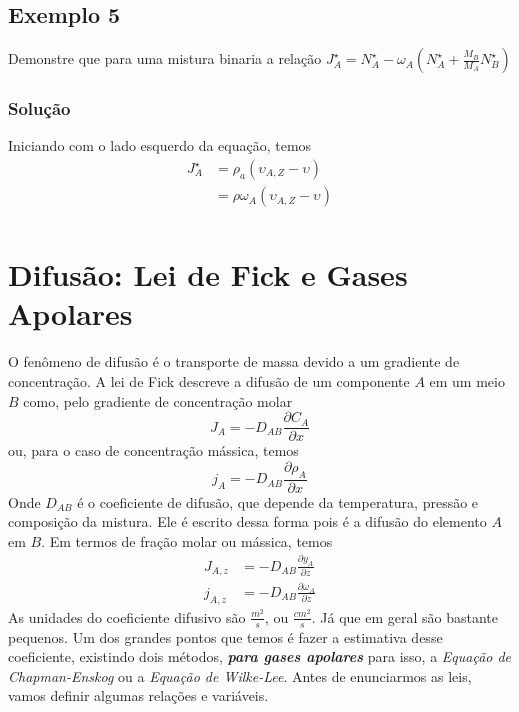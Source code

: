 \subsection{Exemplo 5}
Demonstre que para uma mistura binaria a relação \(J_A ^{\star} = N_{A}^{\star} - \omega_A \left(
N_A^{\star}+ \frac{M_B}{M_A} N_B ^{\star} \right)   \)

\subsubsection{Solução}
Iniciando com o lado esquerdo da equação, temos
\begin{align}
    J_A ^{\star} &= \rho _{a} \left( \upsilon_{A, Z}-\upsilon  \right) \\
    &= \rho \omega_A \left( \upsilon_{A, Z}-\upsilon  \right) \\
\end{align}
\section{Difusão: Lei de Fick e Gases Apolares}
O fenômeno de difusão é o transporte de massa devido a um gradiente de concentração. A lei de Fick
descreve a difusão de um componente \(A\) em um meio \(B\) como, pelo gradiente de concentração molar
\begin{equation}\label{eq:lei de fick_J}
    J_A = -D_{AB} \frac{\partial C_A}{\partial x}
\end{equation}
ou, para o caso de concentração mássica, temos
\begin{equation}\label{eq:lei de fick_j}
    j_A = -D_{AB} \frac{\partial \rho_A}{\partial x}
\end{equation}
Onde \(D_{AB}\) é o coeficiente de difusão, que depende da temperatura, pressão e composição da
mistura. Ele é escrito dessa forma pois é a difusão do elemento \(A\) em \(B\). Em termos de fração
molar ou mássica, temos
\begin{align}
    J_{A,z} &= -D_{AB} \frac{\partial y_A}{\partial z} \\
    j_{A,z} &= -D_{AB} \frac{\partial \omega_A}{\partial z}
\end{align}
As unidades do coeficiente difusivo são \(\frac{m^2}{s}\), ou \(\frac{cm^2}{s}\). Já que em geral
são bastante pequenos. Um dos grandes pontos que temos é fazer a estimativa desse coeficiente,
existindo dois métodos, \textit{\textbf{para gases apolares}}  para isso, a \emph{Equação de Chapman-Enskog} ou a \emph{Equação de
Wilke-Lee}. Antes de enunciarmos as leis, vamos definir algumas relações e variáveis.

